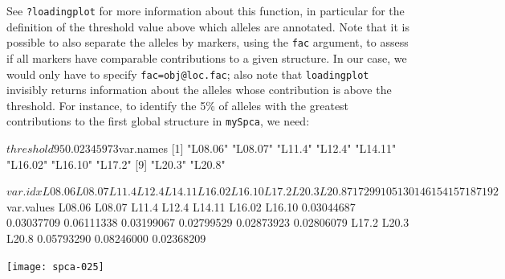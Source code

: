 \documentclass{article}
\begin{document}
\noindent See \texttt{?loadingplot} for more information about this
function, in particular for the definition of the threshold value
above which alleles are annotated.
Note that it is possible to also separate the alleles by markers,
using the \texttt{fac} argument, to assess if all markers have
comparable contributions to a given structure.
In our case, we would only have to specify \texttt{fac=obj@loc.fac};
also note that \texttt{loadingplot} invisibly returns information
about the alleles whose contribution is above the threshold.
For instance, to identify the 5\% of alleles with the greatest
contributions to the first global structure in \texttt{mySpca}, we need:
\begin{Schunk}
\begin{Soutput}
$threshold
       95%
0.02345973 

$var.names
 [1] "L08.06" "L08.07" "L11.4"  "L12.4"  "L14.11" "L16.02" "L16.10" "L17.2" 
 [9] "L20.3"  "L20.8" 

$var.idx
L08.06 L08.07  L11.4  L12.4 L14.11 L16.02 L16.10  L17.2  L20.3  L20.8 
    71     72     99    105    130    146    154    157    187    192 

$var.values
    L08.06     L08.07      L11.4      L12.4     L14.11     L16.02     L16.10 
0.03044687 0.03037709 0.06111338 0.03199067 0.02799529 0.02873923 0.02806079 
     L17.2      L20.3      L20.8 
0.05793290 0.08246000 0.02368209 
\end{Soutput}
\end{Schunk}
\texttt{[image: spca-025]}
\end{document}
